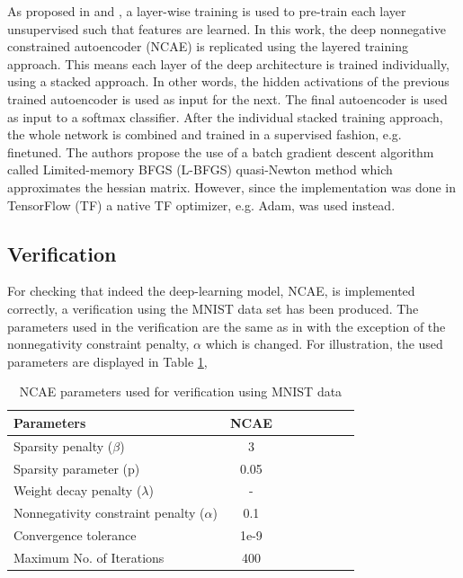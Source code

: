 \documentclass{article}
\begin{document}
As proposed in \cite{Hosseini-Asl2016} and \cite{Vincent}, a layer-wise training is used to pre-train each layer unsupervised such that features are learned. In this work, the deep nonnegative constrained autoencoder (NCAE) is replicated using the layered training approach. This means each layer of the deep architecture is trained individually, using a stacked approach. In other words, the hidden activations of the previous trained autoencoder is used as input for the next. The final autoencoder is used as input to a softmax classifier. After the individual stacked training approach, the whole network is combined and trained in a supervised fashion, e.g. finetuned. The authors propose the use of a batch gradient descent algorithm called Limited-memory BFGS (L-BFGS) quasi-Newton method which approximates the hessian matrix. However, since the implementation was done in TensorFlow (TF) a native TF optimizer, e.g. Adam, was used instead. 

\subsection{Verification}

For checking that indeed the deep-learning model, NCAE, is implemented correctly, a verification using the MNIST data set has been produced. The parameters used in the verification are the same as in \cite{Hosseini-Asl2016} with the exception of the nonnegativity constraint penalty, $\alpha$ which is changed. For illustration, the used parameters are displayed in Table \ref{tab:parameters},

\begin{table}[h]
	\centering
\begin{tabular}{l*{6}{c}r}
	\hline
	Parameters             & NCAE \\
	\hline
	Sparsity penalty ($\beta$) & 3  \\
	\hline
	Sparsity parameter (p)            & 0.05  \\
	\hline
	Weight decay penalty ($\lambda$)           & -  \\
	\hline
	Nonnegativity constraint penalty ($\alpha$)     & 0.1  \\
	\hline
	Convergence tolerance    & 1e-9  \\
	\hline
	Maximum No. of Iterations & 400 \\
	\hline
\end{tabular}
   \caption{NCAE parameters used for verification using MNIST data}
\label{tab:parameters} 
\end{table}
\end{document}
